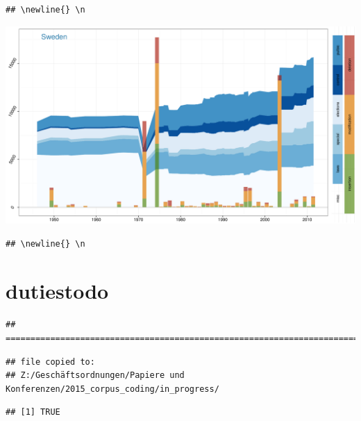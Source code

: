 \documentclass[a4paper, landscape]{article}
\begin{document}
\begin{verbatim}
## \newline{} \n
\end{verbatim}

\includegraphics{country_graphs_files/figure-latex/unnamed-chunk-3-16.pdf}\\

\begin{verbatim}
## \newline{} \n
\end{verbatim}

\pagebreak{}

\section{dutiestodo}\label{dutiestodo}

\begin{verbatim}
## ==========================================================================
\end{verbatim}

\begin{verbatim}
## file copied to: 
## Z:/Geschäftsordnungen/Papiere und Konferenzen/2015_corpus_coding/in_progress/
\end{verbatim}

\begin{verbatim}
## [1] TRUE
\end{verbatim}
\end{document}
